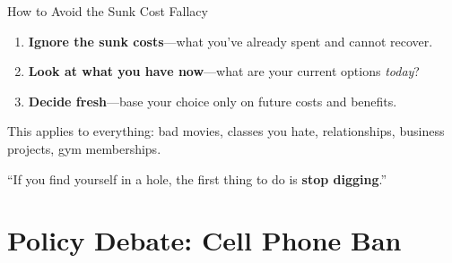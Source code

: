 \documentclass[9pt,english,aspectratio=169]{beamer}
\begin{document}
\begin{frame}{How to Avoid the Sunk Cost Fallacy}

  \begin{enumerate}
    \item \textbf{Ignore the sunk costs}---what you've already spent
          and cannot recover.
    \vspace{0.4em}
    \item \textbf{Look at what you have now}---what are your current
          options \emph{today}?
    \vspace{0.4em}
    \item \textbf{Decide fresh}---base your choice only on future costs
          and benefits.
  \end{enumerate}

  \vspace{0.6em}
  This applies to everything: bad movies, classes you hate, relationships,
  business projects, gym memberships.

  \vspace{0.6em}
  \begin{quotebox}
    ``If you find yourself in a hole, the first thing to do is
    \textbf{stop digging}.''
  \end{quotebox}

\end{frame}

\section{Policy Debate: Cell Phone Ban}
\end{document}
